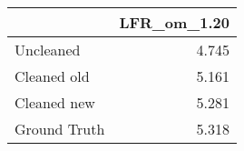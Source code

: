 \begin{tabular}{lr}
\toprule
{} & LFR_om_1.20 \\
\midrule
Uncleaned    &       4.745 \\
Cleaned old  &       5.161 \\
Cleaned new  &       5.281 \\
Ground Truth &       5.318 \\
\bottomrule
\end{tabular}
